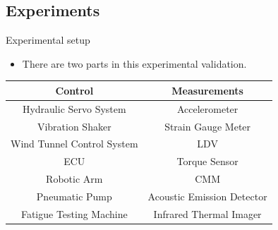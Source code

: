 \documentclass{beamer}
\begin{document}
\subsection{Experiments}

\begin{frame}{Experimental setup}
    \begin{itemize}
        \item There are two parts in this experimental validation.
    \end{itemize}
    \begin{table}[h]
        \centering
        \begin{tabular}{c|c}
            Control & Measurements \\
            \hline
            Hydraulic Servo System & Accelerometer \\
            Vibration Shaker & Strain Gauge Meter \\
            Wind Tunnel Control System & LDV \\
            ECU & Torque Sensor \\
            Robotic Arm & CMM \\
            Pneumatic Pump & Acoustic Emission Detector \\
            Fatigue Testing Machine & Infrared Thermal Imager \\
        \end{tabular}
    \end{table}
\end{frame}
\end{document}
